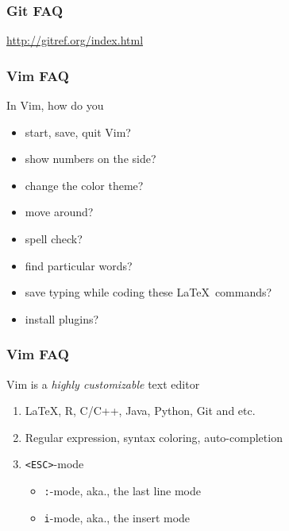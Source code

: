 \documentclass[hyperref={colorlinks=false},handout,10pt]{beamer}
\let\olditem\item
\renewcommand{\item}{\setlength{\itemsep}{0.5\baselineskip}\olditem}
\begin{document}

\begin{frame}
    \frametitle{Git FAQ}
    \begin{center}
        \href{http://gitref.org/index.html}{http://gitref.org/index.html}
    \end{center}
\end{frame}

\begin{frame}
    \frametitle{Vim FAQ}
    In Vim, how do you
    \begin{itemize}
        \item start, save, quit Vim? 
        \item show numbers on the side?
        \item change the color theme?
        \item move around?
        \item spell check?
        \item find particular words?
        \item save typing while coding these \LaTeX\ commands?
        \item install plugins?
    \end{itemize}
\end{frame}

\begin{frame}
    \frametitle{Vim FAQ}
    \begin{block}
        {Vim is a \emph{highly customizable} text editor}
    \vskip0.1in
    \begin{enumerate}
        \item \LaTeX, R, C/C++, Java, Python, Git and etc.
        \item Regular expression, syntax coloring, auto-completion
        \item \texttt{<ESC>}-mode
        \begin{itemize}
            \item \texttt{:}-mode, aka., the last line mode
            \item \texttt{i}-mode, aka., the insert mode
        \end{itemize}
    \end{enumerate}
    \end{block}
\end{frame}
\end{document}
